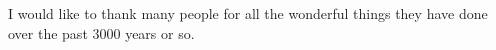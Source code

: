 I would like to thank many people for all the wonderful things they have done over the past 3000 years or so.

